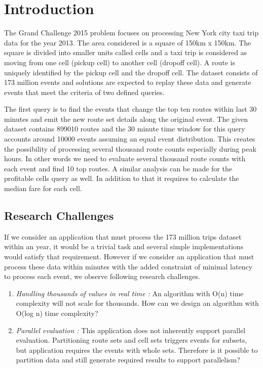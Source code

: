 \section{Introduction}

The Grand Challenge 2015 problem focuses on processing New York city taxi trip data for the year 2013. The area considered is a square of 150km x  150km. The  square is divided into smaller units called cells and a taxi trip is considered as moving from one cell (pickup cell) to another cell (dropoff cell). A route is uniquely identified by the pickup cell and the dropoff cell. The dataset consists of 173 million events and solutions are expected to replay these data and generate events that meet the criteria of two defined queries. 

The first query is to find the events that change the top ten routes within last 30 minutes and emit the new route set details along the original event. The given dataset contains 899010 routes and the 30 minute time window for this query accounts around 10000 events assuming an equal event distribution. This creates the possibility of processing several thousand route counts especially during peak hours. In other words we need to evaluate several thousand route counts with each event and find 10 top routes. A similar analysis can be made for the profitable cells query as well. In addition to that it requires to calculate the median fare for each cell. 

\subsection{Research Challenges}

If we consider an application that must process the 173 million trips dataset within an year, it would be a trivial task and several simple implementations would satisfy that requirement. However if we consider an application that must process these data within minutes with the added constraint of minimal latency to process each event, we observe following research challenges.
\begin{enumerate}
	\item \textit{Handling thousands of values in real time :}  An algorithm with O(n) time complexity will not scale for thousands. How can we design an algorithm with O(log n) time complexity?
	\item \textit{Parallel evaluation :}  This application does not inherently support parallel evaluation. Partitioning route sets and cell sets triggers events for subsets, but application requires the events with whole sets. Therefore is it possible to partition data and still generate required results to support parallelism?  
\end{enumerate}

